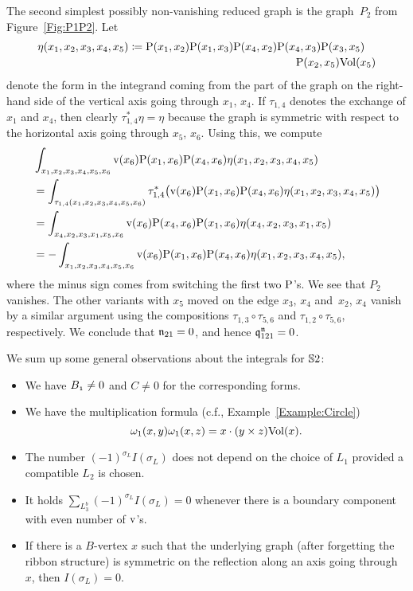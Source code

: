 \documentclass[\MainFolder/Text.tex]{subfiles}
\begin{document}
\begin{Remark}
The second simplest possibly non-vanishing reduced graph is the graph~$P_2$ from Figure~\ref{Fig:P1P2}. Let 
\begin{equation*}
\eta(x_1,x_2,x_3,x_4,x_5) \coloneqq\begin{multlined}[t]\Prpg(x_1,x_2)\Prpg(x_1,x_3)\Prpg(x_4,x_2)\Prpg(x_4,x_3)\Prpg(x_3,x_5)\\ \Prpg(x_2,x_5)\Vol(x_5) \end{multlined}
\end{equation*}
denote the form in the integrand coming from the part of the graph on the right-hand side of the vertical axis going through $x_1$, $x_4$. If $\tau_{1,4}$ denotes the exchange of $x_1$ and $x_4$, then clearly $\tau_{1,4}^* \eta = \eta$ because the graph is symmetric with respect to the horizontal axis going through $x_5$, $x_6$. Using this, we compute
\begin{align*}
& \int_{x_1,x_2,x_3,x_4,x_5,x_6} \mathrm{v}(x_6)\mathrm{P}(x_1,x_6)\mathrm{P}(x_4,x_6) \eta(x_1,x_2,x_3,x_4,x_5) \\
& = \int_{\tau_{1,4}(x_1,x_2,x_3,x_4,x_5,x_6)} \tau_{1,4}^*\bigl(\mathrm{v}(x_6)\mathrm{P}(x_1,x_6)\mathrm{P}(x_4,x_6) \eta(x_1,x_2,x_3,x_4,x_5)\bigr) \\
& = \int_{x_4,x_2,x_3,x_1,x_5,x_6} \mathrm{v}(x_6)\mathrm{P}(x_4,x_6)\mathrm{P}(x_1,x_6) \eta(x_4,x_2,x_3,x_1,x_5)\\
& = 
 -\int_{x_1,x_2,x_3,x_4,x_5,x_6} \mathrm{v}(x_6)\mathrm{P}(x_1,x_6)\mathrm{P}(x_4,x_6)  \eta(x_1,x_2,x_3,x_4,x_5),
\end{align*}
where the minus sign comes from switching the first two $\mathrm{P}$'s. We see that $P_2$ vanishes. The other variants with $x_5$ moved on the edge $x_3$, $x_4$ and~$x_2$, $x_4$ vanish by a similar argument using the compositions $\tau_{1,3}\circ\tau_{5,6}$ and $\tau_{1,2}\circ\tau_{5,6}$, respectively. We conclude that $\mathfrak{n}_{21} = 0$, and hence $\mathfrak{q}_{121}^{\mathfrak{n}} = 0$. 

We sum up some general observations about the integrals for $\mathbb{S}{2}$:

\begin{itemize}
\item We have $B_{\NOne} \neq 0$ and $C \neq 0$ for the corresponding forms.
\item We have the multiplication formula (c.f., Example~\ref{Example:Circle})
\[ \omega_1(x,y) \omega_1(x,z) = x\cdot(y\times z) \mathrm{Vol}(x). \]
\item The number $(-1)^{\sigma_L} I(\sigma_L)$ does not depend on the choice of $L_1$ provided a compatible $L_2$ is chosen.
\item It holds $\sum_{L_3^b} (-1)^{\sigma_L} I(\sigma_L) = 0$ whenever there is a boundary component with even number of $\mathrm{v}$'s.
\item If there is a $B$-vertex $x$ such that the underlying graph (after forgetting the ribbon structure) is symmetric on the reflection along an axis going through $x$, then $I(\sigma_L) = 0$. \qedhere
\end{itemize}


\end{Remark}
\end{document}
